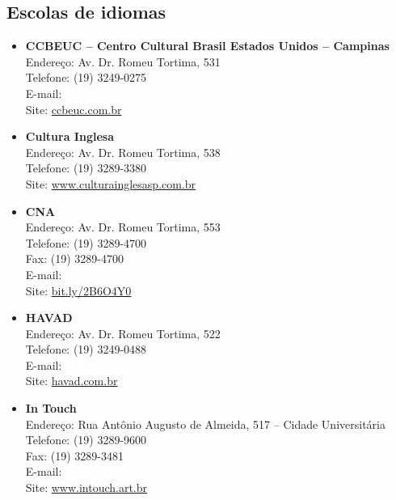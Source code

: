 \subsection{Escolas de idiomas}

\begin{itemize}

    \item   \textbf{CCBEUC -- Centro Cultural Brasil Estados Unidos --
    Campinas}
        \\Endereço: Av. Dr. Romeu Tortima, 531
        \\Telefone: (19) 3249-0275
        \\E-mail: 
        \\Site: \url{ccbeuc.com.br}

    \item   \textbf{Cultura Inglesa}
        \\Endereço: Av. Dr. Romeu Tortima, 538
        \\Telefone: (19) 3289-3380
        \\Site: \url{www.culturainglesasp.com.br}

    \item   \textbf{CNA}
        \\Endereço: Av. Dr. Romeu Tortima, 553
        \\Telefone: (19) 3289-4700
        \\Fax: (19) 3289-4700
        \\E-mail: 
        \\Site: \url{bit.ly/2B6O4Y0}

    \item   \textbf{HAVAD}
        \\Endereço: Av. Dr. Romeu Tortima, 522
        \\Telefone: (19) 3249-0488
        \\E-mail: 
        \\Site: \url{havad.com.br}

    \item   \textbf{In Touch}
        \\Endereço: Rua Antônio Augusto de Almeida, 517 -- Cidade Universitária
        \\Telefone: (19) 3289-9600
        \\Fax: (19) 3289-3481
        \\E-mail: 
        \\Site: \url{www.intouch.art.br}


\end{itemize}
